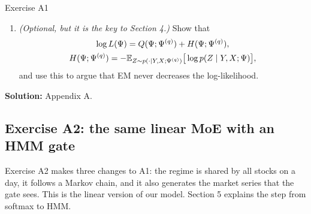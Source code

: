 \begin{exercise}{Exercise A1}
\begin{enumerate}[label=(\alph*)]
\[\]
Redo (b), (c), (d) and (f). What changes in $\tau$, and why does it become much sharper as $N_t$ grows? (Hint: Chamroukhi \& Nguyen \S3.)
\item \emph{(Optional, but it is the key to Section 4.)} Show that
\begin{gather*}
\log L(\Psi)=Q(\Psi;\Psi^{(q)})+H(\Psi;\Psi^{(q)}),\\
H(\Psi;\Psi^{(q)})=-\mathbb{E}_{Z\sim p(\cdot\mid Y,X;\Psi^{(q)})}\big[\log p(Z\mid Y,X;\Psi)\big],
\end{gather*}
and use this to argue that EM never decreases the log-likelihood.
\end{enumerate}
\textbf{Solution:} Appendix A.
\end{exercise}

\subsection{Exercise A2: the same linear MoE with an HMM gate}

Exercise A2 makes three changes to A1: the regime is shared by all stocks on a day, it follows a Markov chain, and it also generates the market series that the gate sees. This is the linear version of our model. Section 5 explains the step from softmax to HMM.

